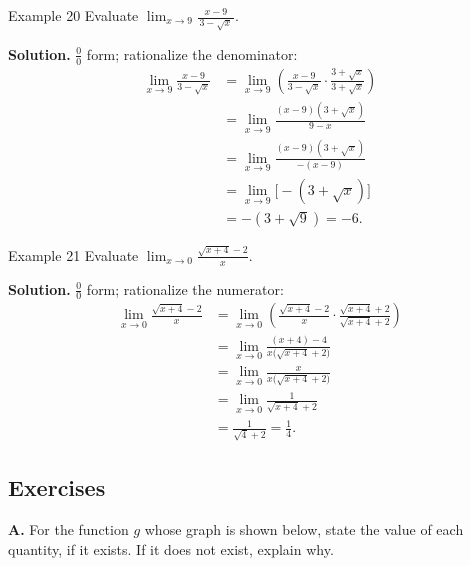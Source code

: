 \begin{examplebox}{Example 20}
Evaluate \(\displaystyle\lim_{x \to 9} \frac{x - 9}{\,3 - \sqrt{x}\,}\).

\medskip
\textbf{Solution.} \(\frac{0}{0}\) form; rationalize the denominator:
\begin{align*}
\lim_{x \to 9} \frac{x - 9}{3 - \sqrt{x}}
&= \lim_{x \to 9} \left( \frac{x - 9}{3 - \sqrt{x}} \cdot \frac{3 + \sqrt{x}}{3 + \sqrt{x}} \right) \\[6pt]
&= \lim_{x \to 9} \frac{(x - 9)(3 + \sqrt{x})}{9 - x} \\[6pt]
&= \lim_{x \to 9} \frac{(x - 9)(3 + \sqrt{x})}{-(x - 9)} \\[6pt]
&= \lim_{x \to 9} \bigl[-(3 + \sqrt{x})\bigr] \\[6pt]
&= -(3 + \sqrt{9})
   = -6.
\end{align*}
\end{examplebox}

\begin{examplebox}{Example 21}
Evaluate \(\displaystyle\lim_{x \to 0} \frac{\sqrt{x + 4} - 2}{x}\).

\medskip
\textbf{Solution.} \(\frac{0}{0}\) form; rationalize the numerator:
\begin{align*}
\lim_{x \to 0} \frac{\sqrt{x + 4} - 2}{x}
&= \lim_{x \to 0} \left( \frac{\sqrt{x + 4} - 2}{x} \cdot \frac{\sqrt{x + 4} + 2}{\sqrt{x + 4} + 2} \right) \\[6pt]
&= \lim_{x \to 0} \frac{(x + 4) - 4}{x\bigl(\sqrt{x + 4} + 2\bigr)} \\[6pt]
&= \lim_{x \to 0} \frac{x}{x\bigl(\sqrt{x + 4} + 2\bigr)} \\[6pt]
&= \lim_{x \to 0} \frac{1}{\sqrt{x + 4} + 2} \\[6pt]
&= \frac{1}{\sqrt{4} + 2}
   = \frac{1}{4}.
\end{align*}
\end{examplebox}



\subsection*{Exercises}
\label{subsec:1.1.4}

\raggedcolumns
\setlength{\columnsep}{1.5em}


\medskip
\textbf{A.} For the function \(g\) whose graph is shown below, state the value of each quantity, if it exists. If it does not exist, explain why.


